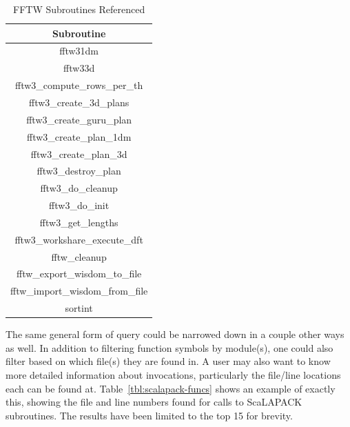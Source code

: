 \begin{table}[htbp]
\caption{FFTW Subroutines Referenced}
\begin{center}
\begin{tabular}{|c|}
\hline
\textbf{Subroutine} \\
\hline
fftw31dm \\
\hline
fftw33d \\
\hline
fftw3\_compute\_rows\_per\_th \\
\hline
fftw3\_create\_3d\_plans \\
\hline
fftw3\_create\_guru\_plan \\
\hline
fftw3\_create\_plan\_1dm \\
\hline
fftw3\_create\_plan\_3d \\
\hline
fftw3\_destroy\_plan \\
\hline
fftw3\_do\_cleanup \\
\hline
fftw3\_do\_init \\
\hline
fftw3\_get\_lengths \\
\hline
fftw3\_workshare\_execute\_dft \\
\hline
fftw\_cleanup \\
\hline
fftw\_export\_wisdom\_to\_file \\
\hline
fftw\_import\_wisdom\_from\_file \\
\hline
sortint \\
\hline
\end{tabular}
\label{tab:fftw-funcs}
\end{center}
\end{table}

The same general form of query could be narrowed down in a couple other ways as well.
In addition to filtering function symbols by module(s), one could also filter based on which file(s) they 
are found in.
A user may also want to know more detailed information about invocations, particularly the file/line 
locations each can be found at.
Table~\ref{tbl:scalapack-funcs} shows an example of exactly this, showing the file and line numbers 
found for calls to ScaLAPACK subroutines.
The results have been limited to the top 15 for brevity.

